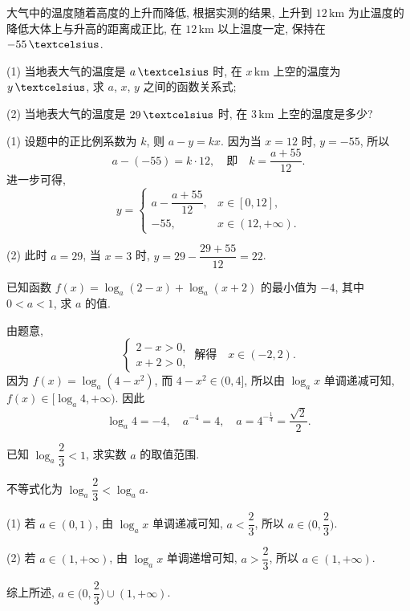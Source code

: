 \begin{example}
    大气中的温度随着高度的上升而降低, 根据实测的结果, 上升到 $12\,\text{km}$ 为止温度的降低大体上与升高的距离成正比, 在 $12\,\text{km}$ 以上温度一定, 保持在 $-55\,\textcelsius$.
    
    (1) 当地表大气的温度是 $a\,\textcelsius$ 时, 在 $x\,\text{km}$ 上空的温度为 $y\,\textcelsius$, 求 $a$, $x$, $y$ 之间的函数关系式;
    
    (2) 当地表大气的温度是 $29\,\textcelsius$ 时, 在 $3\,\text{km}$ 上空的温度是多少?
\end{example}
\begin{solution}
    (1) 设题中的正比例系数为 $k$, 则 $a-y=kx$. 因为当 $x=12$ 时, $y=-55$, 所以 
    \[a-(-55)= k\cdot 12,\quad\text{即}\quad
        k= \frac{a+55}{12}.\]
    进一步可得,
    \[y=\begin{cases}
        a-\dfrac{a+55}{12}, & x\in[0,12],\\
        -55, & x\in(12,+\infty).
    \end{cases}\]
    
    (2) 此时 $a=29$, 当 $x=3$ 时, $y=29 -\dfrac{29+55}{12}=22$.
\end{solution}

\begin{example}
    已知函数 $f(x)= \log_a (2-x)+\log_a(x+2)$ 的最小值为 $-4$, 其中 $0<a<1$, 求 $a$ 的值.
\end{example}
\begin{solution}
    由题意,
    \[\left\{\!\!\begin{array}{l}
        2-x>0,\\
        x+2>0,
      \end{array}\right.\ \text{解得}\quad x\in(-2,2).\]
    因为 $f(x)= \log_a (4-x^2)$, 而 $4-x^2\in(0,4]$, 所以由 $\log_a x$ 单调递减可知, $f(x)\in[\log_a 4,+\infty)$. 因此 
    \[\log_a 4=-4,\quad a^{-4}= 4,\quad
        a= 4^{-\frac14}= \frac{\sqrt2}2.\]
\end{solution}

\begin{example}
    已知 $\log_a \dfrac23<1$, 求实数 $a$ 的取值范围.
\end{example}
\begin{solution}
    不等式化为 $\log_a \dfrac23< \log_a a$.

    (1) 若 $a\in(0,1)$, 由 $\log_a x$ 单调递减可知, $a<\dfrac23$, 所以 $a\in\biggl(0,\dfrac23\biggr)$.
    
    (2) 若 $a\in(1,+\infty)$, 由 $\log_a x$ 单调递增可知, $a>\dfrac23$, 所以 $a\in(1,+\infty)$.
    
    综上所述, $a\in\biggl(0,\dfrac23\biggr)\cup(1,+\infty)$.
\end{solution}

